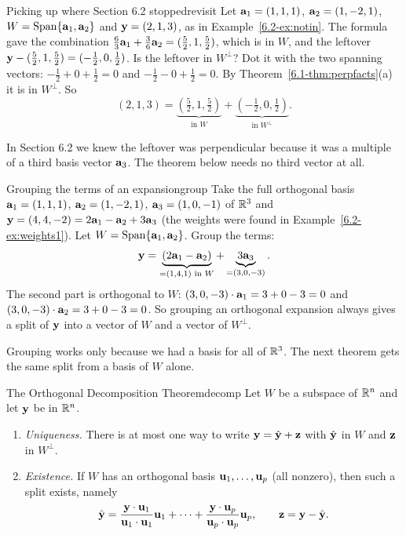 \documentclass[11pt]{article}
\begin{document}
\begin{exmp}{Picking up where Section 6.2 stopped}{revisit}
Let $\mathbf{a}_1=(1,1,1)$, $\mathbf{a}_2=(1,-2,1)$, $W=\operatorname{Span}\{\mathbf{a}_1,\mathbf{a}_2\}$ and $\mathbf{y}=(2,1,3)$, as in Example~\ref{6.2-ex:notin}. The formula gave the combination $\tfrac{6}{3}\mathbf{a}_1+\tfrac{3}{6}\mathbf{a}_2=(\tfrac52,1,\tfrac52)$, which is in $W$, and the leftover $\mathbf{y}-(\tfrac52,1,\tfrac52)=(-\tfrac12,0,\tfrac12)$. Is the leftover in $W^{\perp}$? Dot it with the two spanning vectors: $-\tfrac12+0+\tfrac12=0$ and $-\tfrac12-0+\tfrac12=0$. By Theorem~\ref{6.1-thm:perpfacts}(a) it is in $W^{\perp}$. So
\[
(2,1,3)=\underbrace{(\tfrac52,1,\tfrac52)}_{\text{in }W}+\underbrace{(-\tfrac12,0,\tfrac12)}_{\text{in }W^{\perp}} .
\]
\end{exmp}

In Section 6.2 we knew the leftover was perpendicular because it was a multiple of a third basis vector $\mathbf{a}_3$. The theorem below needs no third vector at all.

\begin{exmp}{Grouping the terms of an expansion}{group}
Take the full orthogonal basis $\mathbf{a}_1=(1,1,1)$, $\mathbf{a}_2=(1,-2,1)$, $\mathbf{a}_3=(1,0,-1)$ of $\mathbb{R}^3$ and $\mathbf{y}=(4,4,-2)=2\mathbf{a}_1-\mathbf{a}_2+3\mathbf{a}_3$ (the weights were found in Example~\ref{6.2-ex:weights1}). Let $W=\operatorname{Span}\{\mathbf{a}_1,\mathbf{a}_2\}$. Group the terms:
\[
\mathbf{y}=\underbrace{(2\mathbf{a}_1-\mathbf{a}_2)}_{=(1,4,1)\text{ in }W}+\underbrace{3\mathbf{a}_3}_{=(3,0,-3)} .
\]
The second part is orthogonal to $W$: $(3,0,-3)\cdot\mathbf{a}_1=3+0-3=0$ and $(3,0,-3)\cdot\mathbf{a}_2=3+0-3=0$. So grouping an orthogonal expansion always gives a split of $\mathbf{y}$ into a vector of $W$ and a vector of $W^{\perp}$.
\end{exmp}

Grouping works only because we had a basis for all of $\mathbb{R}^3$. The next theorem gets the same split from a basis of $W$ alone.

\begin{thm}{The Orthogonal Decomposition Theorem}{decomp}
Let $W$ be a subspace of $\mathbb{R}^n$ and let $\mathbf{y}$ be in $\mathbb{R}^n$.
\begin{enumerate}[label=(\alph*),itemsep=1pt]
  \item \emph{Uniqueness.} There is at most one way to write $\mathbf{y}=\hat{\mathbf{y}}+\mathbf{z}$ with $\hat{\mathbf{y}}$ in $W$ and $\mathbf{z}$ in $W^{\perp}$.
  \item \emph{Existence.} If $W$ has an orthogonal basis $\mathbf{u}_1,\dots,\mathbf{u}_p$ (all nonzero), then such a split exists, namely
\[
\hat{\mathbf{y}}=\frac{\mathbf{y}\cdot\mathbf{u}_1}{\mathbf{u}_1\cdot\mathbf{u}_1}\mathbf{u}_1+\cdots+\frac{\mathbf{y}\cdot\mathbf{u}_p}{\mathbf{u}_p\cdot\mathbf{u}_p}\mathbf{u}_p,\qquad\mathbf{z}=\mathbf{y}-\hat{\mathbf{y}} .
\]
\end{enumerate}
\end{thm}
\end{document}
